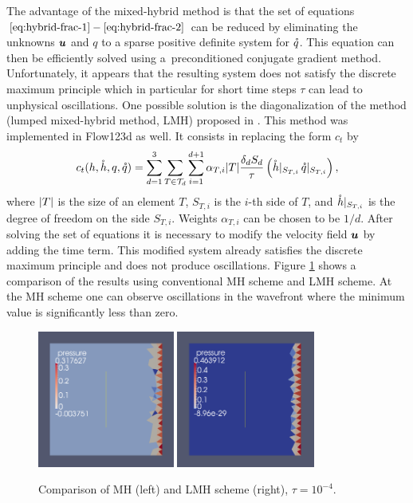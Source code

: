 The advantage of the mixed-hybrid method is that the set of equations $\eqref{eq:hybrid-frac-1} - 
\eqref{eq:hybrid-frac-2}$ can be reduced by eliminating the unknowns $\mathbf{\boldsymbol{u}}$ and $q$
to a sparse positive definite system for $\mathring q$.
This equation can then be efficiently solved using a~preconditioned conjugate gradient method.
Unfortunately, it appears that the resulting system does not satisfy the discrete maximum principle
 which in particular for short time steps $\tau$ can lead to unphysical oscillations.
One possible solution is the diagonalization of the method (lumped mixed-hybrid method, LMH)
 proposed in \cite{younes_2006}.
This method was implemented in Flow123d as well.
It consists in replacing the form $c_t$ by
\[
    c_t(h, \mathring h, q, \mathring q)= \sum_{d=1}^{3}\sum_{T\in \mathcal T_d}
        \sum_{i=1}^{d+1} \alpha_{T,i} \lvert T\rvert \frac{\delta_d S_d}{\tau} 
        \left(\mathring h|_{S_{T,i}}\,  \mathring q|_{S_{T,i}}\right),
\]
where $\lvert T\rvert$ is the size of an element $T$, $S_{T,i}$ is the $i$-th side of $T$, and 
$\mathring h|_{S_{T,i}}$ is the degree of freedom on the side $S_{T,i}$. 
Weights $\alpha_{T,i}$ can be chosen to be $1/d$. 
After solving the set of equations it is necessary to modify the velocity field $\mathbf{\boldsymbol{u}}$
 by adding the time term.
This modified system already satisfies the discrete maximum principle
 and does not produce oscillations.
Figure \ref{fig:LMH} shows a comparison of the results
 using conventional MH scheme and LMH scheme.
At the MH scheme one can observe oscillations in the wavefront
 where the minimum value is significantly less than zero.

\begin{figure}
    \begin{center}
       \includegraphics[width=0.4\textwidth]{figures/MH.png}
       \includegraphics[width=0.405\textwidth]{figures/LMH.png}        
    \end{center}
    \caption{Comparison of MH (left) and LMH scheme (right), $\tau=10^{-4}$.}
    \label{fig:LMH}
\end{figure}

